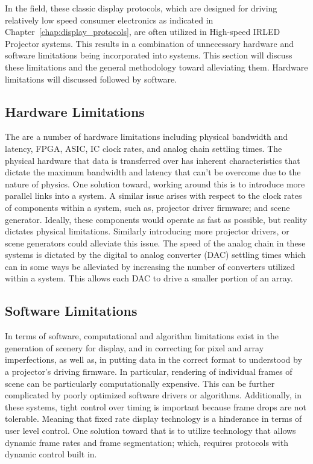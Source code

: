     In the field, these classic display protocols, which are designed for driving relatively low speed consumer electronics as indicated in Chapter~\ref{chap:display_protocols}, are often utilized in High-speed IRLED Projector systems. This results in a combination of unnecessary hardware and software limitations being incorporated into systems. This section will discuss these limitations and the general methodology toward alleviating them. Hardware limitations will discussed followed by software.

    \subsection{Hardware Limitations}
        The are a number of hardware limitations including physical bandwidth and latency, FPGA, ASIC, IC clock rates, and analog chain settling times. The physical hardware that data is transferred over has inherent characteristics that dictate the maximum bandwidth and latency that can't be overcome due to the nature of physics. One solution toward, working around this is to introduce more parallel links into a system. A similar issue arises with respect to the clock rates of components within a system, such as, projector driver firmware; and scene generator. Ideally, these components would operate as fast as possible, but reality dictates physical limitations. Similarly introducing more projector drivers, or scene generators could alleviate this issue. The speed of the analog chain in these systems is dictated by the digital to analog converter (DAC) settling times which can in some ways be alleviated by increasing the number of converters utilized within a system. This allows each DAC to drive a smaller portion of an array.

    \subsection{Software Limitations}
        In terms of software, computational and algorithm limitations exist in the generation of scenery for display, and in correcting for pixel and array imperfections, as well as, in putting data in the correct format to understood by a projector's driving firmware. In particular, rendering of individual frames of scene can be particularly computationally expensive. This can be further complicated by poorly optimized software drivers or algorithms. Additionally, in these systems, tight control over timing is important because frame drops are not tolerable. Meaning that fixed rate display technology is a hinderance in terms of user level control. One solution toward that is to utilize technology that allows dynamic frame rates and frame segmentation; which, requires protocols with dynamic control built in.


